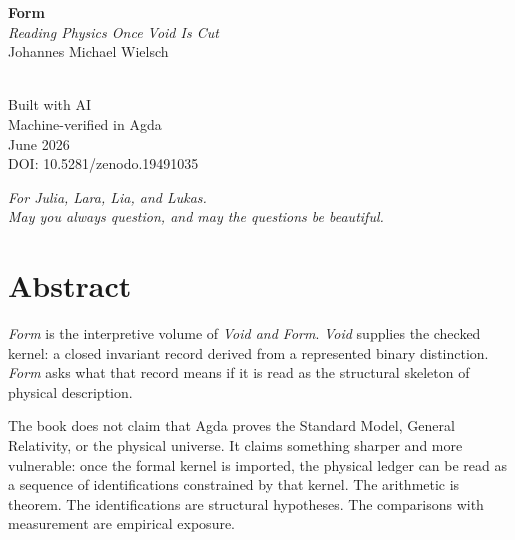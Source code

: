 \documentclass[11pt,a4paper]{book}
\begin{document}
\raggedbottom

\begin{titlepage}
\centering
\vspace*{3cm}
{\Huge\bfseries Form}\\[0.5cm]
{\Large\itshape Reading Physics Once Void Is Cut}\\[2cm]
{\large Johannes Michael Wielsch}\\[4cm]
\\[4cm]
{\small Built with AI}\\
{\small Machine-verified in Agda}\\
\vfill
{\small June 2026}\\
{\small DOI: 10.5281/zenodo.19491035}\\[0.5cm]
\end{titlepage}

\thispagestyle{empty}
\vspace*{\fill}
\begin{center}
\textit{For Julia, Lara, Lia, and Lukas.}\\[0.6em]
\textit{May you always question, and may the questions be beautiful.}
\end{center}
\vspace*{\fill}

\clearpage

\frontmatter

\chapter*{Abstract}

\emph{Form} is the interpretive volume of \emph{Void and Form}.
\emph{Void} supplies the checked kernel: a closed invariant record derived
from a represented binary distinction.  \emph{Form} asks what that record
means if it is read as the structural skeleton of physical description.

The book does not claim that Agda proves the Standard Model, General
Relativity, or the physical universe.  It claims something sharper and more
vulnerable: once the formal kernel is imported, the physical ledger can be
read as a sequence of identifications constrained by that kernel.  The
arithmetic is theorem.  The identifications are structural hypotheses.  The
comparisons with measurement are empirical exposure.
\end{document}
